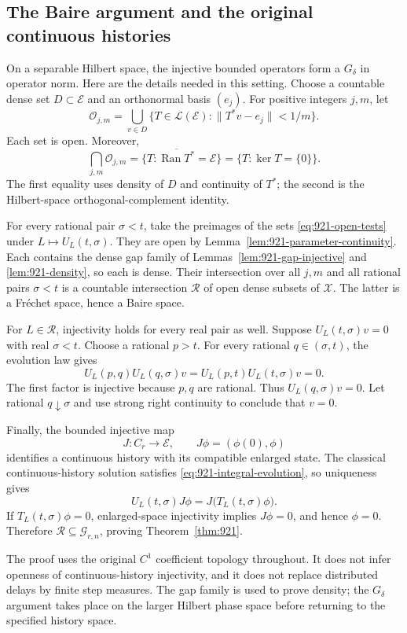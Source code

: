 \documentclass[11pt,a4paper]{article}
\theoremstyle{remark}
\begin{document}
\subsection{The Baire argument and the original continuous histories}

On a separable Hilbert space, the injective bounded operators form a
$G_\delta$ in operator norm. Here are the details needed in this setting.
Choose a countable dense set $D\subset\mathcal E$ and an orthonormal
basis $(e_j)$. For positive integers $j,m$, let
\[
 \mathcal O_{j,m}
 =\bigcup_{v\in D}
   \{T\in\mathcal L(\mathcal E):\|T^*v-e_j\|<1/m\}.
 \tag{921.13}\label{eq:921-open-tests}
\]
Each set is open. Moreover,
\[
 \bigcap_{j,m}\mathcal O_{j,m}
 =\{T:\overline{\operatorname{Ran}T^*}=\mathcal E\}
 =\{T:\ker T=\{0\}\}.
 \tag{921.14}\label{eq:921-injective-gdelta}
\]
The first equality uses density of $D$ and continuity of $T^*$; the
second is the Hilbert-space orthogonal-complement identity.

For every rational pair $\sigma<t$, take the preimages of the sets
\eqref{eq:921-open-tests} under $L\mapsto U_L(t,\sigma)$.
They are open by Lemma~\ref{lem:921-parameter-continuity}. Each contains
the dense gap family of Lemmas~\ref{lem:921-gap-injective} and
\ref{lem:921-density}, so each is dense. Their intersection over all
$j,m$ and all rational pairs $\sigma<t$ is a countable intersection
$\mathcal R$ of open dense subsets of $\mathcal X$. The latter is a
Fr\'echet space, hence a Baire space.

For $L\in\mathcal R$, injectivity holds for every real pair as well.
Suppose $U_L(t,\sigma)v=0$ with real $\sigma<t$. Choose a rational
$p>t$. For every rational $q\in(\sigma,t)$, the evolution law gives
\[
 U_L(p,q)U_L(q,\sigma)v
 =U_L(p,t)U_L(t,\sigma)v=0.
\]
The first factor is injective because $p,q$ are rational. Thus
$U_L(q,\sigma)v=0$. Let rational $q\downarrow\sigma$ and use strong
right continuity to conclude that $v=0$.

Finally, the bounded injective map
\[
 J:C_r\longrightarrow\mathcal E,\qquad
 J\phi=(\phi(0),\phi)
\]
identifies a continuous history with its compatible enlarged state.
The classical continuous-history solution satisfies
\eqref{eq:921-integral-evolution}, so uniqueness gives
\[
 U_L(t,\sigma)J\phi=J\bigl(T_L(t,\sigma)\phi\bigr).
\]
If $T_L(t,\sigma)\phi=0$, enlarged-space injectivity implies $J\phi=0$,
and hence $\phi=0$. Therefore $\mathcal R\subseteq\mathcal G_{r,n}$,
proving Theorem~\ref{thm:921}.

The proof uses the original $C^1$ coefficient topology throughout. It
does not infer openness of continuous-history injectivity, and it does
not replace distributed delays by finite step measures. The gap family
is used to prove density; the $G_\delta$ argument takes place on the
larger Hilbert phase space before returning to the specified history space.
\end{document}
